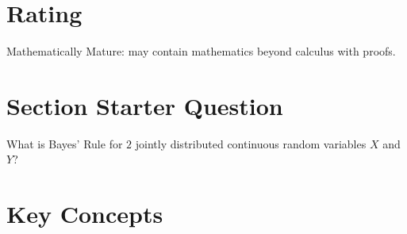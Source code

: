 \documentclass[12pt]{article}
\begin{document}
\myheader \mytitle

\hr


\hr

\usefirefox

\hr



\section*{Rating} %
Mathematically Mature:  may contain mathematics beyond calculus with
proofs.  %

\hr

\section*{Section Starter Question}

What is Bayes' Rule for \( 2 \) jointly distributed continuous random
variables \( X \) and \( Y \)?

\hr

\section*{Key Concepts}
\end{document}
